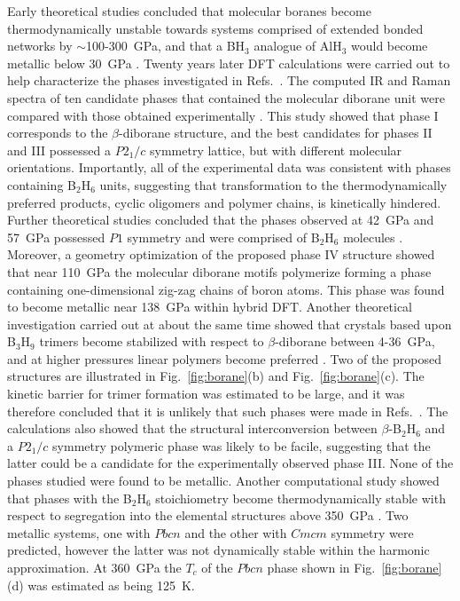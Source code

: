 \documentclass[12pt,letterpaper,oneside]{article}
\begin{document}
Early theoretical studies concluded that molecular boranes become thermodynamically unstable towards systems comprised of extended bonded networks by $\sim$100-300~GPa, and that a BH$_3$ analogue of AlH$_3$ would become metallic below 30~GPa \cite{Barbee:1997-B}. Twenty years later DFT calculations \cite{Torabi:2013-B,Torabi:2015-B} were carried out to help characterize the phases investigated in Refs.\ \cite{Murli:2009a,Song:2009-B}. The computed IR and Raman spectra of ten candidate phases that contained the molecular diborane unit were  compared with those obtained experimentally \cite{Torabi:2013-B}. This study showed that phase I corresponds to the $\beta$-diborane structure, and the best candidates for phases II and III possessed a $P2_1/c$ symmetry lattice, but with different molecular orientations. Importantly, all of the experimental data was consistent with phases containing B$_2$H$_6$ units, suggesting that transformation to the thermodynamically preferred products, cyclic oligomers and polymer chains, is kinetically hindered. Further theoretical studies concluded that the phases observed at 42~GPa and 57~GPa possessed $P1$ symmetry and were comprised of B$_2$H$_6$ molecules \cite{Torabi:2015-B}. Moreover, a geometry optimization of the proposed phase IV structure showed that near 110~GPa the molecular diborane motifs polymerize forming a phase containing  one-dimensional zig-zag chains of boron atoms. This phase was found to become metallic near 138~GPa within hybrid DFT. Another theoretical investigation carried out at about the same time showed that crystals based upon B$_3$H$_9$ trimers become stabilized with respect to $\beta$-diborane between 4-36~GPa, and at higher pressures linear polymers become preferred \cite{Yao:2011a}. Two of the proposed structures are illustrated in Fig.\ \ref{fig:borane}(b) and Fig.\ \ref{fig:borane}(c). The kinetic barrier for trimer formation was estimated to be large, and it was therefore concluded that it is unlikely that such phases were made in Refs.\ \cite{Murli:2009a,Song:2009-B}. The calculations also showed that the structural interconversion between $\beta$-B$_2$H$_6$ and a $P2_1/c$ symmetry polymeric phase was likely to be facile, suggesting that the latter could be a candidate for the experimentally observed phase III. None of the phases studied were found to be metallic. Another computational study showed that phases with the B$_2$H$_6$ stoichiometry become thermodynamically stable with respect to segregation into the elemental structures above 350~GPa \cite{Abe:2011a}. Two metallic systems, one with $Pbcn$ and the other with $Cmcm$ symmetry were predicted, however the latter was not dynamically stable within the harmonic approximation. At 360~GPa the $T_c$ of the $Pbcn$ phase shown in Fig.\ \ref{fig:borane}(d) was estimated as being 125~K. 
\end{document}
